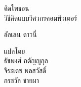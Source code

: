 \begin{latexonly}

\renewcommand{\blankpage}{\thispagestyle{empty} \quad \newpage}













\pagebreak
\thispagestyle{empty}

\begin{flushright}
\vspace*{2.0in}

\begin{spacing}{3}
{\huge คิดไพธอน}\\
{\Large วิธีคิดแบบวิศวกรคอมพิวเตอร์}
\end{spacing}

\vspace{0.25in}



\thedate

\vspace{1in}


{\Large
อัลเลน ดาวนี่
}

{\large
แปลโดย
\\
ธัชพงศ์ กตัญญูกุล
\\
จิระเดช พลสวัสดิ์
\\
กรชวัล ชายผา
\\
}


\end{flushright}
\end{latexonly}
